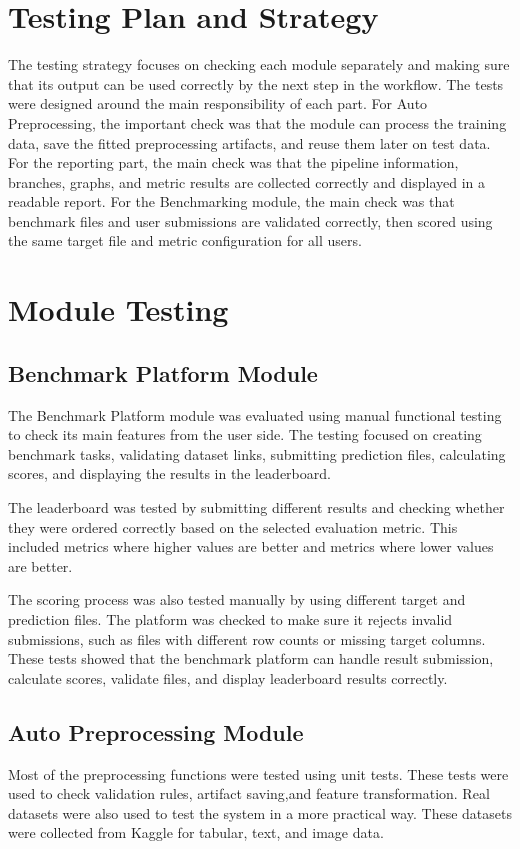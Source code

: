 \documentclass[12pt,a4paper,oneside]{report}
\begin{document}
\section{Testing Plan and Strategy}
The testing strategy focuses on checking each module separately and making sure
that its output can be used correctly by the next step in the workflow. The
tests were designed around the main responsibility of each part. For Auto
Preprocessing, the important check was that the module can process the training
data, save the fitted preprocessing artifacts, and reuse them later on test data.
For the reporting part, the main check was that the pipeline information,
branches, graphs, and metric results are collected correctly and displayed in a
readable report. For the Benchmarking module, the main check was that benchmark
files and user submissions are validated correctly, then scored using the same
target file and metric configuration for all users.

\section{Module Testing}

\subsection{Benchmark Platform Module}

The Benchmark Platform module was evaluated using manual functional testing to check its main features from the user side. The testing focused on creating benchmark tasks, validating dataset links, submitting prediction files, calculating scores, and displaying the results in the leaderboard.

\noindent The leaderboard was tested by submitting different results and checking whether they were ordered correctly based on the selected evaluation metric. This included metrics where higher values are better and metrics where lower values are better.

\noindent The scoring process was also tested manually by using different target and prediction files. The platform was checked to make sure it rejects invalid submissions, such as files with different row counts or missing target columns. These tests showed that the benchmark platform can handle result submission, calculate scores, validate files, and display leaderboard results correctly.

\subsection{Auto Preprocessing Module}
Most of the preprocessing functions were tested using unit tests. These tests
were used to check validation rules, artifact saving,and feature transformation. Real datasets were also used to test the system in a
more practical way. These datasets were collected from Kaggle for tabular,
text, and image data.
\end{document}
